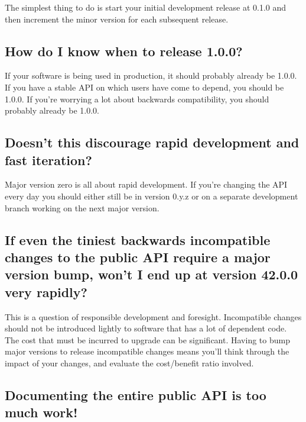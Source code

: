 \documentclass[a4paper,12pt,notitlepage,twoside,openright]{article}
\begin{document}
The simplest thing to do is start your initial development release at
0.1.0 and then increment the minor version for each subsequent release.

\hypertarget{how-do-i-know-when-to-release-1.0.0}{%
\subsection{How do I know when to release
1.0.0?}\label{how-do-i-know-when-to-release-1.0.0}}

If your software is being used in production, it should probably already
be 1.0.0. If you have a stable API on which users have come to depend,
you should be 1.0.0. If you're worrying a lot about backwards
compatibility, you should probably already be 1.0.0.

\hypertarget{doesnt-this-discourage-rapid-development-and-fast-iteration}{%
\subsection{Doesn't this discourage rapid development and fast
iteration?}\label{doesnt-this-discourage-rapid-development-and-fast-iteration}}

Major version zero is all about rapid development. If you're changing
the API every day you should either still be in version 0.y.z or on a
separate development branch working on the next major version.

\hypertarget{if-even-the-tiniest-backwards-incompatible-changes-to-the-public-api-require-a-major-version-bump-wont-i-end-up-at-version-42.0.0-very-rapidly}{%
\subsection{If even the tiniest backwards incompatible changes to the
public API require a major version bump, won't I end up at version
42.0.0 very
rapidly?}\label{if-even-the-tiniest-backwards-incompatible-changes-to-the-public-api-require-a-major-version-bump-wont-i-end-up-at-version-42.0.0-very-rapidly}}

This is a question of responsible development and foresight.
Incompatible changes should not be introduced lightly to software that
has a lot of dependent code. The cost that must be incurred to upgrade
can be significant. Having to bump major versions to release
incompatible changes means you'll think through the impact of your
changes, and evaluate the cost/benefit ratio involved.

\hypertarget{documenting-the-entire-public-api-is-too-much-work}{%
\subsection{Documenting the entire public API is too much
work!}\label{documenting-the-entire-public-api-is-too-much-work}}
\end{document}
